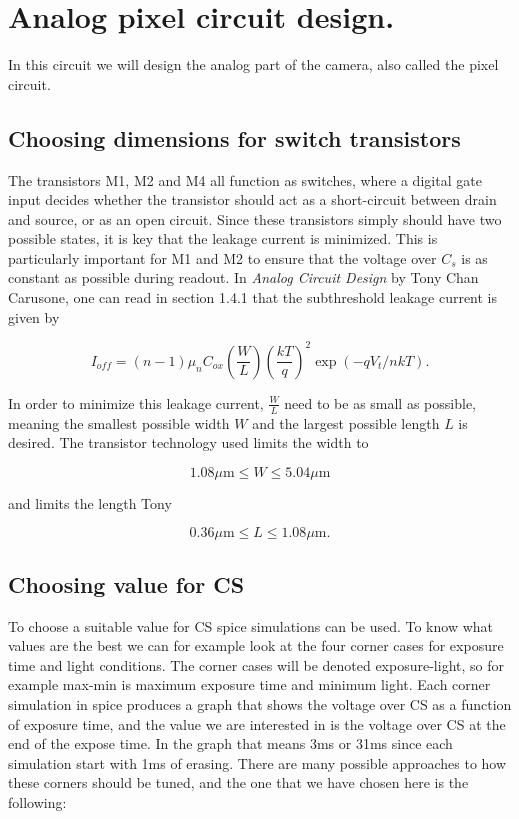 \section{Analog pixel circuit design.}

In this circuit we will design the analog part of the camera, also called the pixel circuit.

\subsection{Choosing dimensions for switch transistors}
The transistors M1, M2 and M4 all function as switches, where a digital gate input decides whether the transistor should act as a short-circuit between drain and source, or as an open circuit. Since these transistors simply should have two possible states, it is key that the leakage current is minimized. This is particularly important for M1 and M2 to ensure that the voltage over $C_s$ is as constant as possible during readout. In \emph{Analog Circuit Design} by Tony Chan Carusone, one can read in section 1.4.1 that the subthreshold leakage current is given by

\begin{equation}
    \label{eq:leakage}
    I_{off} = (n-1) \mu_n C_{ox} \left( \frac{W}{L} \right) \left( \frac{kT}{q} \right)^2 \exp{(-qV_t / nkT)}.
\end{equation}

In order to minimize this leakage current, $\frac{W}{L}$ need to be as small as possible, meaning the smallest possible width $W$ and the largest possible length $L$ is desired. The transistor technology used limits the width to 

\begin{equation}
    \label{limitsW}
    1.08 \mu\textrm{m} \leq W \leq 5.04 \mu\textrm{m}
\end{equation}

and limits the length Tony

\begin{equation}
    \label{limitsL}
    0.36 \mu\textrm{m} \leq L \leq 1.08 \mu\textrm{m}.
\end{equation}

\subsection{Choosing value for CS}

To choose a suitable value for CS spice simulations can be used. To know what values are the best we can for example look at the four corner cases for exposure time and light conditions. The corner cases will be denoted exposure-light, so for example max-min is maximum exposure time and minimum light. Each corner simulation in spice produces a graph that shows the voltage over CS as a function of exposure time, and the value we are interested in is the voltage over CS at the end of the expose time. In the graph that means 3ms or 31ms since each simulation start with 1ms of erasing. There are many possible approaches to how these corners should be tuned, and the one that we have chosen here is the following:


